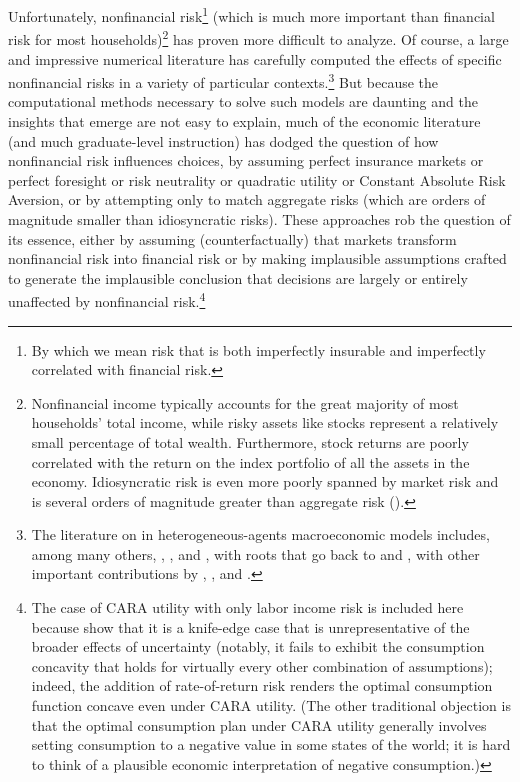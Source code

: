 \documentclass[titlepage,abstract]{\econtex}\newcommand{\texname}{ctDiscrete}
\begin{document}
Unfortunately, nonfinancial risk\footnote{By which we mean risk that
  is both imperfectly insurable and imperfectly correlated with
  financial risk.} (which is much more important than financial risk
for most households)\footnote{Nonfinancial income typically accounts
  for the great majority of most households' total income, while risky
  assets like stocks represent a relatively small percentage of total
  wealth. Furthermore, stock returns are poorly correlated with the
  return on the index portfolio of all the assets in the economy.
  Idiosyncratic risk is even more poorly spanned by market risk and is
  several orders of magnitude greater than aggregate risk
  (\cite{Jagannathan:Kubota:Takehara:1998}).}  has proven more
difficult to analyze.  Of course, a large and impressive numerical
literature has carefully computed the effects of specific nonfinancial
risks in a variety of particular contexts.\footnote{The literature on
  in heterogeneous-agents macroeconomic models includes, among many
  others, \cite{carroll:brookings}, \cite{aiyagari:ge}, and
  \cite{ksHetero}, with roots that go back to
  \cite{schectman&escudero:results} and \cite{bewleyPIH}, with other
  important contributions by \cite{clarida:ergodic},
  \cite{zeldesStochastic}, and \cite{cw:cUnderUncert}.}  But because the
computational methods necessary to solve such models are daunting and
the insights that emerge are not easy to explain, much of the economic
literature (and much graduate-level instruction) has dodged the
question of how nonfinancial risk influences choices, by assuming
perfect insurance markets or perfect foresight or risk neutrality or
quadratic utility or Constant Absolute Risk Aversion, or by attempting
only to match aggregate risks (which are orders of magnitude smaller
than idiosyncratic risks).  These approaches rob the question of its
essence, either by assuming (counterfactually) that markets transform
nonfinancial risk into financial risk or by making implausible
assumptions crafted to generate the implausible conclusion
that decisions are largely or entirely unaffected by nonfinancial
risk.\footnote{The case of CARA utility with only labor income risk is
  included here because \cite{carroll&kimball:concavity} show that it
  is a knife-edge case that is unrepresentative of the broader effects
  of uncertainty (notably, it fails to exhibit the consumption
  concavity that holds for virtually every other combination of
  assumptions); indeed, the addition of rate-of-return risk renders
  the optimal consumption function concave even under CARA utility.
  (The other traditional objection is that the optimal consumption
  plan under CARA utility generally involves setting consumption to a
  negative value in some states of the world; it is hard to think of a
  plausible economic interpretation of negative consumption.)}
\end{document}
